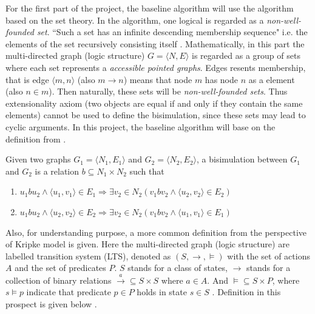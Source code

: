 For the first part of the project, the baseline algorithm will use the algorithm based on the set theory. 
In the algorithm, one logical is regarded as a \emph{non-well-founded set}. 
``Such a set has an infinite descending membership sequence" i.e. the elements of the set recursively consisting itself \cite{Aczel}.
Mathematically, in this part the multi-directed graph (logic structure) $G = \langle N, E \rangle$ is regarded as a group of sets where each set represents a \emph{accessible pointed graphs}.
Edges resents membership, that is edge $\langle m, n \rangle$ (also $m \rightarrow n$) means that node $m$ has node $n$ as a element (also $n \in m$).
Then naturally, these sets will be \emph{non-well-founded sets}.
Thus extensionality axiom (two objects are equal if and only if they contain the same elements) cannot be used to define the bisimulation, since these sets may lead to cyclic arguments.
In this project, the baseline algorithm will base on the definition from \cite{Dovier2004}.
\begin{defin}
Given two graphs $G_1=\langle N_1, E_1 \rangle$ and $G_2=\langle N_2, E_2 \rangle$, a bisimulation between $G_1$ and $G_2$ is a relation $b\subseteq N_1 \times N_2$ such that
\renewcommand{\labelenumi}{\arabic{enumi})}
\begin{enumerate}
    \item $u_1b u_2 \wedge \langle u_1, v_1 \rangle \in E_1 \Rightarrow \exists v_2 \in N_2(v_1b v_2 \wedge \langle u_2, v_2 \rangle \in E_2)$
    \item $u_1b u_2 \wedge \langle u_2, v_2 \rangle \in E_2 \Rightarrow \exists v_2 \in N_2(v_1b v_2 \wedge \langle u_1, v_1 \rangle \in E_1)$
\end{enumerate}
\end{defin}
Also, for understanding purpose, a more common definition from the perspective of Kripke model \cite{Glabbeek2011} is given.
Here the multi-directed graph (logic structure) are labelled transition system (LTS), denoted as $(S, \rightarrow, \models)$ with the set of actions $A$ and the set of predicates $P$. $S$ stands for a class of states, $\rightarrow$ stands for a collection of binary relations $\stackrel{a}{\rightarrow}\subseteq S\times S$ where $a \in A$. 
And $\models \subseteq S \times P$, where $s\models p$ indicate that predicate $p \in P$ holds in state $s \in S$ \cite{Glabbeek2011}. Definition in this prospect is given below \cite{Glabbeek2011}.

